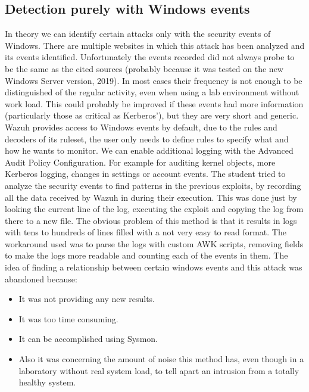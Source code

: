 \subsection{Detection purely with Windows events}
In theory we can identify certain attacks only with the security events of Windows. There are multiple websites in which this attack has been analyzed and its events identified\cite{events_1}\cite{detection_events}.
\linej
Unfortunately the events recorded did not always probe to be the same as the cited sources (probably because it was tested on the new Windows Server version, 2019).
In most cases their frequency is not enough to be distinguished of the regular activity, even when using a lab environment without work load.
This could probably be improved if these events had more information (particularly those as critical as Kerberos'), but they are very short and generic.
\linej
\linej
Wazuh provides access to Windows events by default, due to the rules and decoders of its ruleset\cite{wazuh_ossec_ruleset}, the user only needs to define rules to specify what and how he wants to monitor.
\linej
We can enable additional logging with the Advanced Audit Policy Configuration. For example for auditing kernel objects, more Kerberos logging, changes in settings or account events.
\linej
\linej
The student tried to analyze the security events to find patterns in the previous exploits, by recording all the data received by Wazuh in during their execution. This was done just by looking the current line of the log, executing the exploit and copying the log from there to a new file.
\linej
The obvious problem of this method is that it results in logs with tens to hundreds of lines filled with a not very easy to read format. The workaround used was to parse the logs with custom AWK scripts\cite{memoria_github}, removing fields to make the logs more readable and counting each of the events in them.
\linej
\linej
The idea of finding a relationship between certain windows events and this attack was abandoned because:
\begin{itemize}
	\item It was not providing any new results.
	\item It was too time consuming.
	\item It can be accomplished using Sysmon\cite{sysmon}\cite{sysmon_event_7_mimikatz}.
	\item Also it was concerning the amount of noise this method has, even though in a laboratory without real system load, to tell apart an intrusion from a totally healthy system.
\end{itemize}
